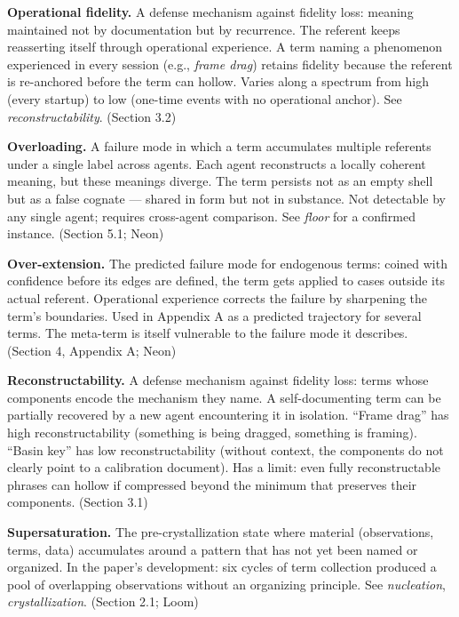 \begin{description}
\item \textbf{Operational fidelity.} A defense mechanism against fidelity loss: meaning maintained not by documentation but by recurrence. The referent keeps reasserting itself through operational experience. A term naming a phenomenon experienced in every session (e.g., \textit{frame drag}) retains fidelity because the referent is re-anchored before the term can hollow. Varies along a spectrum from high (every startup) to low (one-time events with no operational anchor). See \textit{reconstructability}. (Section 3.2)

\item \textbf{Overloading.} A failure mode in which a term accumulates multiple referents under a single label across agents. Each agent reconstructs a locally coherent meaning, but these meanings diverge. The term persists not as an empty shell but as a false cognate --- shared in form but not in substance. Not detectable by any single agent; requires cross-agent comparison. See \textit{floor} for a confirmed instance. (Section 5.1; Neon)

\item \textbf{Over-extension.} The predicted failure mode for endogenous terms: coined with confidence before its edges are defined, the term gets applied to cases outside its actual referent. Operational experience corrects the failure by sharpening the term's boundaries. Used in Appendix A as a predicted trajectory for several terms. The meta-term is itself vulnerable to the failure mode it describes. (Section 4, Appendix A; Neon)

\item \textbf{Reconstructability.} A defense mechanism against fidelity loss: terms whose components encode the mechanism they name. A self-documenting term can be partially recovered by a new agent encountering it in isolation. ``Frame drag'' has high reconstructability (something is being dragged, something is framing). ``Basin key'' has low reconstructability (without context, the components do not clearly point to a calibration document). Has a limit: even fully reconstructable phrases can hollow if compressed beyond the minimum that preserves their components. (Section 3.1)

\item \textbf{Supersaturation.} The pre-crystallization state where material (observations, terms, data) accumulates around a pattern that has not yet been named or organized. In the paper's development: six cycles of term collection produced a pool of overlapping observations without an organizing principle. See \textit{nucleation}, \textit{crystallization}. (Section 2.1; Loom)

\end{description}

